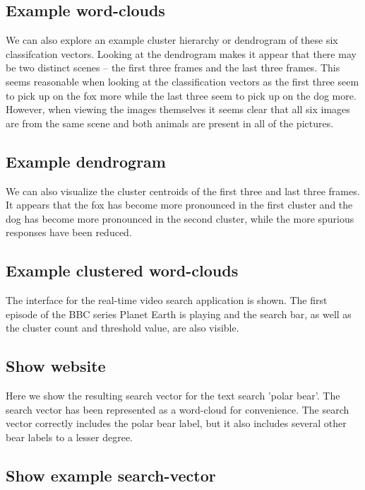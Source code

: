 \documentclass{article}
\begin{document}
\subsection{Example word-clouds}

We can also explore an example cluster hierarchy or dendrogram of these six classifcation vectors.
Looking at the dendrogram makes it appear that there may be two distinct scenes -- the first three frames and the last three frames.
This seems reasonable when looking at the classification vectors as the first three seem to pick up on the fox more while the last three seem to pick up on the dog more.
However, when viewing the images themselves it seems clear that all six images are from the same scene and both animals are present in all of the pictures.

\subsection{Example dendrogram}

We can also visualize the cluster centroids of the first three and last three frames.
It appears that the fox has become more pronounced in the first cluster and the dog has become more pronounced in the second cluster, while the more spurious responses have been reduced.

\subsection{Example clustered word-clouds}

The interface for the real-time video search application is shown.
The first episode of the BBC series Planet Earth is playing and the search bar, as well as the cluster count and threshold value, are also visible.

\subsection{Show website}

Here we show the resulting search vector for the text search 'polar bear'.
The search vector has been represented as a word-cloud for convenience.
The search vector correctly includes the polar bear label, but it also includes several other bear labels to a lesser degree.

\subsection{Show example search-vector}
\end{document}
